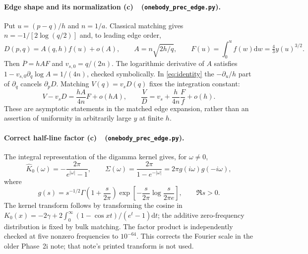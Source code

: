 \documentclass[11pt,a4paper]{article}
\newcommand{\Lc}{\textbf{(c)}\ }
\newcommand{\dd}{\mathrm d}
\newcommand{\edge}{\texttt{onebody\_\allowbreak prec\_\allowbreak edge.py}}
\begin{document}
\paragraph{Edge shape and its normalization \Lc\ (\edge).}
Put $u=(p-q)/h$ and $n=1/a$. Classical matching gives
$n=-1/[2\log(q/2)]$ and, to leading edge order,
\begin{equation}
 D(p,q)=A(q,h)f(u)+o(A),\qquad
 A=n\sqrt{2h/q},\qquad F(u)=\int_0^u f(w)\dd w=\tfrac43 y(u)^{3/2}.
 \label{eq:edgeform}
\end{equation}
Then $\overline P=hAF$ and $v_{s,0}=q/(2n)$.
The logarithmic derivative of $A$ satisfies
$1-v_{s,0}\partial_q\log A=1/(4n)$, checked symbolically.
In \eqref{eq:identity} the $-\partial_u/h$ part of $\partial_q$
cancels $\partial_pD$. Matching $V(q)=v_sD(q)$ fixes the integration constant:
\begin{equation}
 V-v_sD=\frac{hA}{4n}F+o(hA),\qquad
 \frac VD=v_s+\frac{h}{4n}\frac Ff+o(h).
 \label{eq:velocityedge}
\end{equation}
These are asymptotic statements in the matched edge expansion, rather than
an assertion of uniformity in arbitrarily large $y$ at finite $h$.

\paragraph{Correct half-line factor \Lc\ (\edge).}
The integral representation of the digamma kernel gives, for $\omega\ne0$,
\begin{equation}
 \widehat K_0(\omega)=-\frac{2\pi}{e^{|\omega|}-1},\qquad
 \Sigma(\omega)=\frac{2\pi}{1-e^{-|\omega|}}
              =2\pi g(i\omega)g(-i\omega),
\end{equation}
where
\begin{equation}
 g(s)=s^{-1/2}\Gamma\left(1+\frac{s}{2\pi}\right)
 \exp\left[-\frac{s}{2\pi}\log\frac{s}{2\pi e}\right],\qquad \Re s>0.
\end{equation}
The kernel transform follows by transforming the cosine in
$K_0(x)=-2\gamma+2\int_0^\infty(1-\cos xt)/(e^t-1)\dd t$;
the additive zero-frequency distribution is fixed by bulk matching.
The factor product is independently checked at five nonzero frequencies
to $10^{-64}$. This corrects the Fourier scale in the older Phase~2i note;
that note's printed transform is not used.
\end{document}

